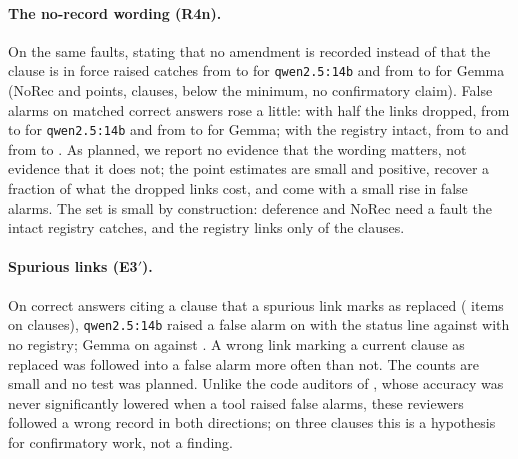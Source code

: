 \paragraph{The no-record wording (R4n).} On the same faults, stating that no amendment is recorded instead of that
the clause is in force raised catches from \CatchDroppedRFourQwenFourteen{} to \CatchDroppedRFournQwenFourteen{}
for \texttt{qwen2.5:14b} and from \CatchDroppedRFourGemma{} to \CatchDroppedRFournGemma{} for Gemma (NoRec
\DiffNoRecQwenFourteen{} and \DiffNoRecGemma{} points, \NNoRecClausesQwenFourteen{} clauses, below the minimum,
no confirmatory claim). False alarms on matched correct answers rose a little: with half the links dropped, from
\FAMQwenFourteenRFourDropFifty{} to \FAMQwenFourteenRFourNDropFifty{} for \texttt{qwen2.5:14b} and from
\FAMGemmaRFourDropFifty{} to \FAMGemmaRFourNDropFifty{} for Gemma; with the registry intact, from
\FAMQwenFourteenRFour{} to \FAMQwenFourteenRFourN{} and from \FAMGemmaRFour{} to \FAMGemmaRFourN. As planned, we
report no evidence that the wording matters, not evidence that it does not; the point estimates are small and
positive, recover a fraction of what the dropped links cost, and come with a small rise in false alarms. The set is
small by construction: deference and NoRec need a fault the intact registry catches, and the registry links only
\NRegistryFlagged{} of the \NClauses{} clauses.

\paragraph{Spurious links (E3$'$).} On correct answers citing a clause that a spurious link marks as replaced
(\KNSpuriousMarkedQwenFourteen{} items on \NSpuriousClausesQwenFourteen{} clauses), \texttt{qwen2.5:14b} raised a false alarm on
\FASpuriousMarkedQwenFourteen{} with the status line against \OwnFASpuriousMarkedQwenFourteen{} with no registry;
Gemma on \FASpuriousMarkedGemma{} against \OwnFASpuriousMarkedGemma{}. A wrong link marking a current clause as
replaced was followed into a false alarm more often than not. The counts are small and no test was planned. Unlike the code auditors of \citet{liu2026trusting}, whose accuracy was never significantly lowered
when a tool raised false alarms, these reviewers followed a wrong record in both directions; on three clauses this is a
hypothesis for confirmatory work, not a finding.


